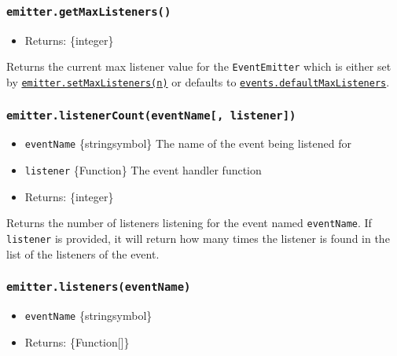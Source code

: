 \subsubsection{\texorpdfstring{\texttt{emitter.getMaxListeners()}}{emitter.getMaxListeners()}}\label{emitter.getmaxlisteners}

\begin{itemize}
\tightlist
\item
  Returns: \{integer\}
\end{itemize}

Returns the current max listener value for the \texttt{EventEmitter}
which is either set by
\hyperref[emittersetmaxlistenersn]{\texttt{emitter.setMaxListeners(n)}}
or defaults to
\hyperref[eventsdefaultmaxlisteners]{\texttt{events.defaultMaxListeners}}.

\subsubsection{\texorpdfstring{\texttt{emitter.listenerCount(eventName{[},\ listener{]})}}{emitter.listenerCount(eventName{[}, listener{]})}}\label{emitter.listenercounteventname-listener}

\begin{itemize}
\tightlist
\item
  \texttt{eventName} \{string\textbar symbol\} The name of the event
  being listened for
\item
  \texttt{listener} \{Function\} The event handler function
\item
  Returns: \{integer\}
\end{itemize}

Returns the number of listeners listening for the event named
\texttt{eventName}. If \texttt{listener} is provided, it will return how
many times the listener is found in the list of the listeners of the
event.

\subsubsection{\texorpdfstring{\texttt{emitter.listeners(eventName)}}{emitter.listeners(eventName)}}\label{emitter.listenerseventname}

\begin{itemize}
\tightlist
\item
  \texttt{eventName} \{string\textbar symbol\}
\item
  Returns: \{Function{[}{]}\}
\end{itemize}

